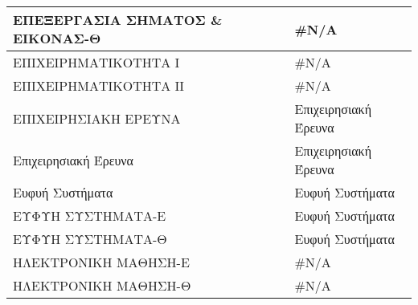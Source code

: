 \documentclass[12pt,a4paper,final]{article}
\begin{document}
\begin{landscape}
\begin{center}
\begin{longtable}{|l|l|}
\hline
ΕΠΕΞΕΡΓΑΣΙΑ ΣΗΜΑΤΟΣ \& ΕΙΚΟΝΑΣ-Θ                                                                                & \#N/A                                                                                                                \\ 
\hline
ΕΠΙΧΕΙΡΗΜΑΤΙΚΟΤΗΤΑ Ι                                                                                            & \#N/A                                                                                                                \\ 
\hline
ΕΠΙΧΕΙΡΗΜΑΤΙΚΟΤΗΤΑ ΙΙ                                                                                           & \#N/A                                                                                                                \\ 
\hline
ΕΠΙΧΕΙΡΗΣΙΑΚΗ ΕΡΕΥΝΑ                                                                                            & Επιχειρησιακή Έρευνα                                                                                                 \\ 
\hline
Επιχειρησιακή Έρευνα                                                                                            & Επιχειρησιακή Έρευνα                                                                                                 \\ 
\hline
Ευφυή Συστήματα                                                                                                 & Ευφυή Συστήματα                                                                                                      \\ 
\hline
ΕΥΦΥΗ ΣΥΣΤΗΜΑΤΑ-Ε                                                                                               & Ευφυή Συστήματα                                                                                                      \\ 
\hline
ΕΥΦΥΗ ΣΥΣΤΗΜΑΤΑ-Θ                                                                                               & Ευφυή Συστήματα                                                                                                      \\ 
\hline
ΗΛΕΚΤΡΟΝΙΚΗ ΜΑΘΗΣΗ-Ε                                                                                            & \#N/A                                                                                                                \\ 
\hline
ΗΛΕΚΤΡΟΝΙΚΗ ΜΑΘΗΣΗ-Θ                                                                                            & \#N/A                                                                                                                \\ 

\end{longtable}
\end{center}
\end{landscape}
\end{document}
